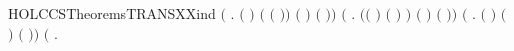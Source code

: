 \begin{SaveVerbatim}{HOLCCSTheoremsTRANSXXind}
       \ensuremath{(}\HOLSymConst{\HOLTokenForall{}}    .
              \ensuremath{(} \ensuremath{)}  \HOLSymConst{\HOLTokenConj{}}
              \ensuremath{(} \ensuremath{(} \ensuremath{)}\ensuremath{)}  \HOLSymConst{\HOLTokenImp{}}
             \ensuremath{(} \HOLSymConst{\ensuremath{\mid}} \ensuremath{)} \HOLConst{\ensuremath{\tau}} \ensuremath{(} \HOLSymConst{\ensuremath{\mid}} \ensuremath{)}\ensuremath{)} \HOLSymConst{\HOLTokenConj{}}
       \ensuremath{(}\HOLSymConst{\HOLTokenForall{}}    .
                \HOLSymConst{\HOLTokenConj{}}
            \ensuremath{(}\ensuremath{(} \HOLSymConst{\ensuremath{=}} \HOLConst{\ensuremath{\tau}}\ensuremath{)} \HOLSymConst{\HOLTokenDisj{}} \ensuremath{(} \HOLSymConst{\ensuremath{=}}  \ensuremath{)} \HOLSymConst{\HOLTokenConj{}}  \HOLConst{\HOLTokenNotIn{}}  \HOLSymConst{\HOLTokenConj{}}   \HOLConst{\HOLTokenNotIn{}} \ensuremath{)} \HOLSymConst{\HOLTokenImp{}}
             \ensuremath{(}  \ensuremath{)}  \ensuremath{(}  \ensuremath{)}\ensuremath{)} \HOLSymConst{\HOLTokenConj{}}
       \ensuremath{(}\HOLSymConst{\HOLTokenForall{}}   .
                \HOLSymConst{\HOLTokenImp{}}
             \ensuremath{(}  \ensuremath{)} \ensuremath{(}  \ensuremath{)} \ensuremath{(}  \ensuremath{)}\ensuremath{)} \HOLSymConst{\HOLTokenConj{}}
       \ensuremath{(}\HOLSymConst{\HOLTokenForall{}}   .

\end{SaveVerbatim}
